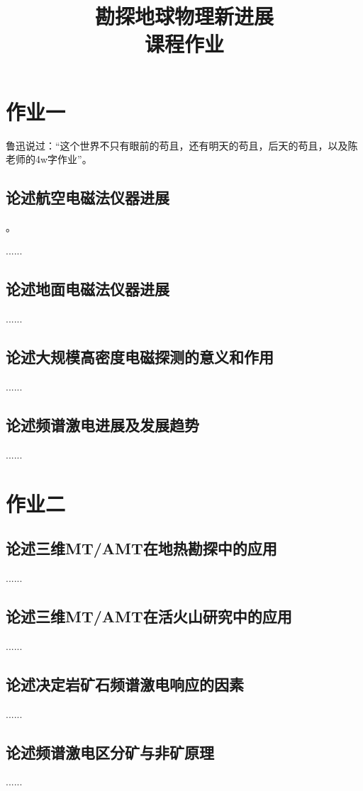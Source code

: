 \documentclass{coursework}
\title{勘探地球物理新进展\\课程作业}%
\begin{document}
	\maketitle	
	\section{作业一}
	鲁迅说过：“这个世界不只有眼前的苟且，还有明天的苟且，后天的苟且，以及陈老师的4w字作业”\citep{luxun}。
	\subsection{论述航空电磁法仪器进展}
	\citep{Fountain1998,AUKEN201747}。
	
	......
	\subsection{论述地面电磁法仪器进展}
	......
	\subsection{论述大规模高密度电磁探测的意义和作用}
	......
	\subsection{论述频谱激电进展及发展趋势}
	......
	
	\section{作业二}
	\subsection{论述三维MT/AMT在地热勘探中的应用}
	......	
	\subsection{论述三维MT/AMT在活火山研究中的应用}
	......	
	\subsection{论述决定岩矿石频谱激电响应的因素}
	......	
	\subsection{论述频谱激电区分矿与非矿原理}
	......	
	
\end{document}
